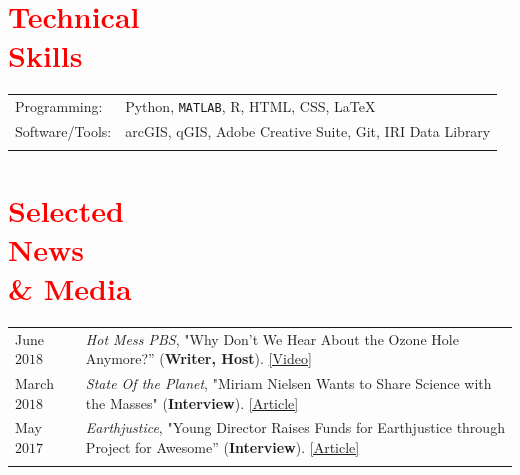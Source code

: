\documentclass[margin, line, palatino, courier, 10pt]{res}
\begin{document}
\begin{resume}

\section{\sc \textcolor{Red}{\large{Technical \\ Skills}}}
\vspace*{0.05in}
\begin{tabular}{@{}p{1in}p{4in}}

Programming:& Python, \texttt{MATLAB}, R, HTML, CSS, \LaTeX \\
Software/Tools:&  arcGIS, qGIS, Adobe Creative Suite, Git, IRI Data Library \\\\

\end{tabular}


\section{\sc \textcolor{Red}{\large{Selected  \\News \\ \& Media}}}
\vspace*{0.04in}
\begin{tabular}{@{}p{1in}p{4in}}
June $2018$ & \textit{Hot Mess PBS}, "Why Don’t We Hear About the Ozone Hole Anymore?'' (\textbf{Writer, Host}). \href{https://www.youtube.com/watch?v=mQpa_NYXUGI}{[Video]}\\

March $2018$ & \textit{State Of the Planet}, "Miriam Nielsen Wants to Share Science with the Masses" (\textbf{Interview}). \href{https://blogs.ei.columbia.edu/2018/03/05/miriam-nielsen-science-communications/}{[Article]}\\

May $2017$ & \textit{Earthjustice}, "Young Director Raises Funds for Earthjustice through Project for Awesome'' (\textbf{Interview}). \href{http://earthjustice.org/blog/2017-may/director-raises-funds-for-earthjustice-through-project-for-awesome}{[Article]}\\


\\
\end{tabular}


\end{resume}
\end{document}
